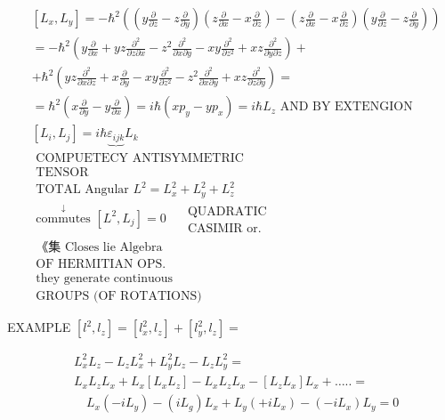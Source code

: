 $$
\begin{aligned}
& {\left[L_{x}, L_{y}\right]=-\hbar^{2}\left(\left(y \frac{\partial}{\partial z}-z \frac{\partial}{\partial y}\right)\left(z \frac{\partial}{\partial x}-x \frac{\partial}{\partial z}\right)-\left(z \frac{\partial}{\partial x}-x \frac{\partial}{\partial z}\right)\left(y \frac{\partial}{\partial z}-z \frac{\partial}{\partial y}\right)\right)} \\
& =-\hbar^{2}\left(y \frac{\partial}{\partial x}+y z \frac{\partial^{2}}{\partial z \partial x}-z^{2} \frac{\partial^{2}}{\partial x \partial y}-x y \frac{\partial^{2}}{\partial z^{2}}+x z \frac{\partial^{2}}{\partial y \partial z}\right)+ \\
& +\hbar^{2}\left(y z \frac{\partial^{2}}{\partial x \partial z}+x \frac{\partial}{\partial y}-x y \frac{\partial^{2}}{\partial z^{2}}-z^{2} \frac{\partial^{2}}{\partial x \partial y}+x z \frac{\partial^{2}}{\partial z \partial y}\right)= \\
& =\hbar^{2}\left(x \frac{\partial}{\partial y}-y \frac{\partial}{\partial x}\right)=i \hbar\left(x p_{y}-y p_{x}\right)=i \hbar L_{z} \text { AND BY EXTENGION } \\
& {\left[L_{i}, L_{j}\right]=i \hbar \underbrace{\varepsilon_{i jk}} L_{k}} \\
& \text { COMPUETECY ANTISYMMETRIC } \\
& \text { TENSOR } \\
& \text { TOTAL Angular } L^{2}=L_{x}^{2}+L_{y}^{2}+L_{z}^{2} \\
& \stackrel{\downarrow}{\text { commutes }}\left[L^{2}, L_{j}\right]=0 \quad \begin{array}{l}
\text { QUADRATIC } \\
\text { CASIMIR or. }
\end{array} \\
& \text { 《集 Closes lie Algebra } \\
& \text { OF HERMITIAN OPS. } \\
& \text { they generate continuous } \\
& \text { GROUPS (OF ROTATIONS) }
\end{aligned}
$$

EXAMPLE $\left[l^{2}, l_{z}\right]=\left[l_{x}^{2}, l_{z}\right]+\left[l_{y}^{2}, l_{z}\right]=$

$$
\begin{aligned}
& L_{x}^{2} L_{z}-L_{z} L_{x}^{2}+L_{y}^{2} L_{z}-L_{z} L_{y}^{2}= \\
& L_{x} L_{z} L_{x}+L_{x}\left[L_{x} L_{z}\right]-L_{x} L_{z} L_{x}-\left[L_{z} L_{x}\right] L_{x}+\ldots . .= \\
& \quad L_{x}\left(-i L_{y}\right)-\left(i L_{g}\right) L_{x}+L_{y}\left(+i L_{x}\right)-\left(-i L_{x}\right) L_{y}=0
\end{aligned}
$$

